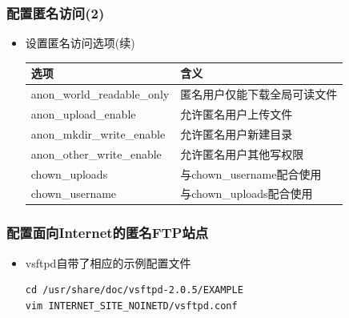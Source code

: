 \documentclass[xcolor=svgnames,presentation]{beamer}
\begin{document}
\begin{frame}
\frametitle{配置匿名访问(2)}
\label{sec-3-6}
\begin{itemize}

\item 设置匿名访问选项(续)\\
\label{sec-3-6-1}%
\begin{center}
\begin{tabular}{ll}
 选项                         &  含义                          \\
\hline
 anon\_world\_readable\_only  &  匿名用户仅能下载全局可读文件  \\
 anon\_upload\_enable         &  允许匿名用户上传文件          \\
 anon\_mkdir\_write\_enable   &  允许匿名用户新建目录          \\
 anon\_other\_write\_enable   &  允许匿名用户其他写权限        \\
 chown\_uploads               &  与chown\_username配合使用     \\
 chown\_username              &  与chown\_uploads配合使用      \\
\end{tabular}
\end{center}


\end{itemize} %
\end{frame}
\begin{frame}[fragile]
\frametitle{配置面向Internet的匿名FTP站点}
\label{sec-3-7}
\begin{itemize}

\item vsftpd自带了相应的示例配置文件\\
\label{sec-3-7-1}%
\begin{verbatim}
cd /usr/share/doc/vsftpd-2.0.5/EXAMPLE
vim INTERNET_SITE_NOINETD/vsftpd.conf
\end{verbatim}
\end{itemize} %
\end{frame}
\end{document}
